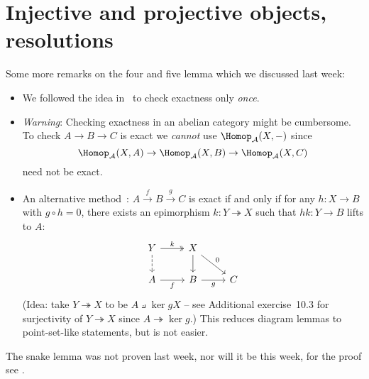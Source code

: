 \documentclass[../main.tex]{subfiles}
\begin{document}
\chapter{Injective and projective objects, resolutions}



Some more remarks on the four and five lemma which we discussed last week:
\begin{itemize}
    \item We followed the idea in~\cite{IversenCohomologyOfSheaves} to check exactness only \emph{once}.
    \item \emph{Warning}: Checking exactness in an abelian category might be cumbersome. To check $A\to B\to C$ is exact we \emph{cannot} use $\Hom[\cat A](X, -)$ since
    \[\Hom[\cat A](X,A) \to \Hom[\cat A](X, B) \to \Hom[\cat A](X,C)\]
    need not be exact.
    \item An alternative method~\cite[Tag~08N5]{stacks-project}: $A\xrightarrow{f} B\xrightarrow{g} C$ is exact if and only if for any $h\colon X\to B$ with $g\circ h= 0$, there exists an epimorphism $k\colon Y\twoheadrightarrow X$ such that $hk\colon Y\to B$ lifts to $A$: 
    \[\begin{tikzcd}
    	Y & X \\
    	A & B & C
    	\arrow["k", two heads, from=1-1, to=1-2]
    	\arrow[from=1-1, to=2-1, dashed]
    	\arrow[from=1-2, to=2-2]
    	\arrow["0", from=1-2, to=2-3]
    	\arrow["f"', from=2-1, to=2-2]
    	\arrow["g"', from=2-2, to=2-3]
    \end{tikzcd}\]
    (Idea: take $Y\twoheadrightarrow X$ to be $A\pullback{\ker g} X$ -- see Additional exercise~10.3 for surjectivity of $Y\twoheadrightarrow X$ since $A\twoheadrightarrow \ker g$.)
    This reduces diagram lemmas to point-set-like statements, but is not easier.
\end{itemize}

The snake lemma was not proven last week, nor will it be this week, for the proof see \cite[\S~\RN{1}.1]{IversenCohomologyOfSheaves}.
\end{document}
